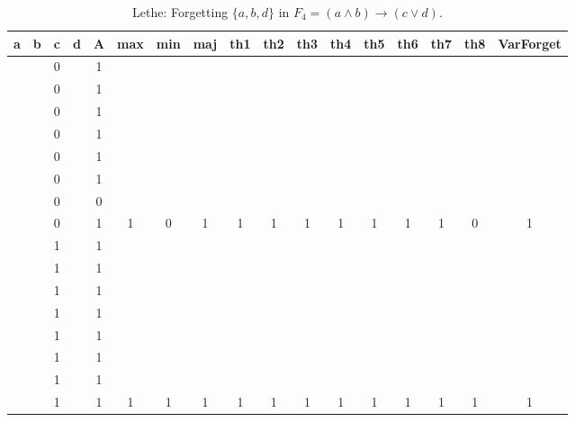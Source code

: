 \begin{table}[!tb]
    \centering
    \begin{tabular}{|c|c|c|c|c|c|c|c|c|c|c|c|c|c|c|c|c|}
        \hline
        \textbf{a} & \textbf{b} & \textbf{c} & \textbf{d} & \textbf{A} & \textbf{max} & \textbf{min} & \textbf{maj} & \textbf{th1} & \textbf{th2} & \textbf{th3} & \textbf{th4} & \textbf{th5} & \textbf{th6} & \textbf{th7} & \textbf{th8} & \textbf{VarForget} \\ \hline
        \rowcolor{gray!40}  &  & 0 &  & 1 &  &  &  &  &  &  &  &  &  &  &  &  \\ \hline
        \rowcolor{gray!40}  &  & 0 &  & 1 &  &  &  &  &  &  &  &  &  &  &  &  \\ \hline
        \rowcolor{gray!40}  &  & 0 &  & 1 &  &  &  &  &  &  &  &  &  &  &  &  \\ \hline
        \rowcolor{gray!40}  &  & 0 &  & 1 &  &  &  &  &  &  &  &  &  &  &  &  \\ \hline
        \rowcolor{gray!40}  &  & 0 &  & 1 &  &  &  &  &  &  &  &  &  &  &  &  \\ \hline
        \rowcolor{gray!40}  &  & 0 &  & 1 &  &  &  &  &  &  &  &  &  &  &  &  \\ \hline
        \rowcolor{gray!40}  &  & 0 &  & 0 &  &  &  &  &  &  &  &  &  &  &  &  \\ \hline
        \rowcolor{gray!40}  &  & 0 &  & 1 & 1 & 0 & 1 & 1 & 1 & 1 & 1 & 1 & 1 & 1 & 0 & 1 \\ \hline
        \rowcolor{blue!40}  &  & 1 &  & 1 &  &  &  &  &  &  &  &  &  &  &  &  \\ \hline
        \rowcolor{blue!40}  &  & 1 &  & 1 &  &  &  &  &  &  &  &  &  &  &  &  \\ \hline
        \rowcolor{blue!40}  &  & 1 &  & 1 &  &  &  &  &  &  &  &  &  &  &  &  \\ \hline
        \rowcolor{blue!40}  &  & 1 &  & 1 &  &  &  &  &  &  &  &  &  &  &  &  \\ \hline
        \rowcolor{blue!40}  &  & 1 &  & 1 &  &  &  &  &  &  &  &  &  &  &  &  \\ \hline
        \rowcolor{blue!40}  &  & 1 &  & 1 &  &  &  &  &  &  &  &  &  &  &  &  \\ \hline
        \rowcolor{blue!40}  &  & 1 &  & 1 &  &  &  &  &  &  &  &  &  &  &  &  \\ \hline
        \rowcolor{blue!40}  &  & 1 &  & 1 & 1 & 1 & 1 & 1 & 1 & 1 & 1 & 1 & 1 & 1 & 1 & 1 \\ \hline
    \end{tabular}
    \caption{Lethe: Forgetting $\{a, b, d\}$ in $F_{4} = (a \land b) \rightarrow (c \lor d)$.}
    \label{tab:lethe-F4-abd}
\end{table}
